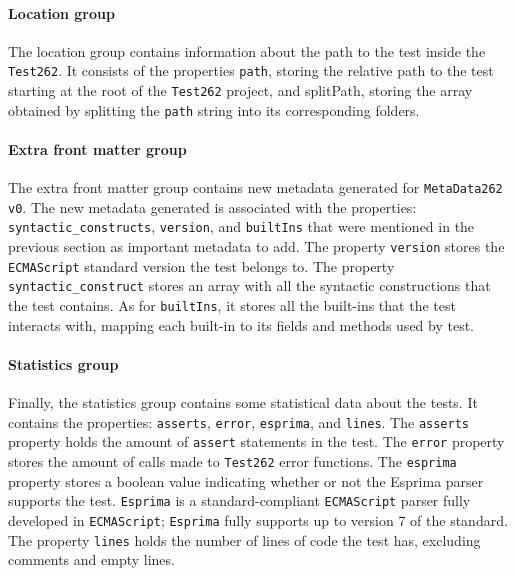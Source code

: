 \documentclass[runningheads]{llncs}
\begin{document}
\paragraph{Location group}
The location group contains information about the path to the test inside the \texttt{Test262}. It consists of the properties \texttt{path}, storing the relative path to the test starting at the root of the \texttt{Test262} project, and splitPath, storing the array obtained by splitting the \texttt{path} string into its corresponding folders.


\paragraph{Extra front matter group}
The extra front matter group contains new metadata generated for \texttt{MetaData262 v0}. The new metadata generated is associated with the properties: \texttt{syntactic\_constructs}, \texttt{version}, and \texttt{builtIns} that were mentioned in the previous section as important metadata to add. The property \texttt{version} stores the \texttt{ECMAScript} standard version the test belongs to. The property \texttt{syntactic\_construct} stores an array with all the syntactic constructions that the test contains. As for \texttt{builtIns}, it stores all the built-ins that the test interacts with, mapping each built-in to its fields and methods used by test.


\paragraph{Statistics group}
Finally, the statistics group contains some statistical data about the tests. It contains the properties: \texttt{asserts}, \texttt{error}, \texttt{esprima}, and \texttt{lines}. The \texttt{asserts} property holds the amount of \texttt{assert} statements in the test. The \texttt{error} property stores the amount of calls made to \texttt{Test262} error functions. The \texttt{esprima} property stores a boolean value indicating whether or not the Esprima\cite{Esprima} parser supports the test. \texttt{Esprima} is a standard-compliant \texttt{ECMAScript} parser fully developed in \texttt{ECMAScript}; \texttt{Esprima} fully supports up to version 7 of the standard. The property \texttt{lines} holds the number of lines of code the test has, excluding comments and empty lines.
\end{document}
